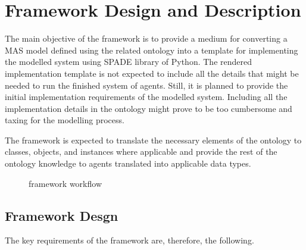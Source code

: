 \chapter{Framework Design and Description}\label{ch: Framework Design}


The main objective of the \magoontologyname framework
is to provide a medium for converting a \ac{MAS} model defined using the related \magoontologyname ontology into a template for implementing the modelled system using \ac{SPADE} library of Python. The rendered implementation template is not expected to include all the details that might be needed to run the finished system of agents. Still, it is planned to provide the initial implementation requirements of the modelled system. Including all the implementation details in the ontology might prove to be too cumbersome and taxing for the modelling process.

The framework is expected to translate the necessary elements of the ontology to classes, objects, and instances where applicable and provide the rest of the ontology knowledge to agents translated into applicable data types.

\begin{figure}
    \centering
    
    \caption{\magoontologyname framework workflow}
    \label{fig: ontology framework template}
\end{figure}



\section{Framework Desgn}

The key requirements of the framework are, therefore, the following.

